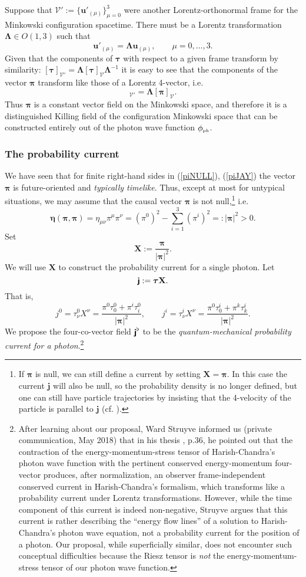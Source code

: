 \documentclass[12pt]{article}
\theoremstyle{definition}
\newcommand{\refeq}[1]{(\ref{#1})}
\newcommand{\tenseur}[1]{{\textbf{\textsf{#1}}}}
\newcommand{\bMj}{{\tenseur{j}}}
\newcommand{\bpi}{\boldsymbol{\pi}}
\numberwithin{equation}{section}
\newcommand{\bj}{\mathbf{j}}
\newcommand{\bu}{\mathbf{u}}
\newcommand{\bX}{\mathbf{X}}
\newcommand{\btau}{\boldsymbol{\tau}}
\newcommand{\beq}{\begin{equation}}
\newcommand{\eeq}{\end{equation}}
\newcommand{\cV}{\mathcal{V}}
\newcommand{\bLa}{\boldsymbol{\Lambda}}
\newcommand{\phiPH}{{\phi_{\mbox{\rm\tiny ph}}}}
\begin{document}
 Suppose that $\cV' := \{\bu'_{(\mu)}\}_{\mu=0}^3$ were another Lorentz-orthonormal frame for the Minkowski configuration spacetime. 
 There must be a Lorentz transformation $\bLa \in O(1,3)$ such that 
\beq
\bu'_{(\mu)} = \bLa \bu_{(\mu)},\qquad \mu = 0,\dots,3.
\eeq
Given that the components of $\btau$ with respect to a given frame transform by similarity: 
$[\btau]_{\cV'} = \bLa [\btau]_{\cV} \bLa^{-1}$ it is easy to see that the components of the vector $\bpi$ transform like those of a 
Lorentz 4-vector, i.e. 
\beq 
[\bpi]_{\cV'} = \bLa [\bpi]_{\cV}.
\eeq
Thus $\bpi$ is a constant vector field on the Minkowski space, and therefore it is a distinguished Killing field of the configuration 
Minkowski space that can be constructed entirely out of the photon wave function $\phiPH$.  
\subsubsection{The probability current}
 We have seen that for finite right-hand sides in \refeq{piNULL}, \refeq{piJAY} the vector $\bpi$ is 
future-oriented and \emph{typically timelike}.
 Thus, except at most for untypical situations, we may assume that the causal vector $\bpi$ is not null,\footnote{If 
   $\bpi$ is null, we can still define a current by setting $\bX = \bpi$. 
 In this case the current $\bj$ will also be null, so the probability density is no longer defined, but one can still have particle 
   trajectories by insisting that the 4-velocity of the particle is parallel to $\bj$ (cf. \cite{BerndlETal}).}
i.e. 
\beq
\boldsymbol{\eta} (\bpi,\bpi) = \eta_{\mu\nu}\pi^\mu \pi^\nu = 
 (\pi^0)^2 - \sum_{i=1}^3 (\pi^i)^2  =: |\bpi|^2 >0.
\eeq
 Set
\beq
\bX := \frac{\bpi}{|\bpi|^2}.
\eeq
 We will use $\bX$ to construct the probability current for a single photon. 
 Let
\beq \label{def:j}
\bMj := \btau \bX.
\eeq
 That is,
\beq
j^0 = \tau^0_\nu X^\nu = \frac{\pi^0 \tau^0_0 + \pi^i \tau^0_i}{|\bpi|^2},\qquad
j^i = \tau^i_\nu X^\nu = \frac{\pi^0 \tau^i_0 + \pi^k \tau^i_k}{|\bpi|^2}.
\eeq
 We propose the four-co-vector field $\bMj^\flat$ to be the \emph{quantum-mechanical probability current for a photon}.\footnote{After 
   learning about our proposal, Ward Struyve informed us (private communication, May 2018) that in his thesis \cite{StruyvePHD}, p.36, 
   he pointed out that the contraction of the energy-momentum-stress tensor of Harish-Chandra's photon wave function with the pertinent conserved
   energy-momentum four-vector produces, after normalization, an observer frame-independent conserved current in Harish-Chandra's formalism, 
   which transforms like a probability current under Lorentz transformations.
   However, while the time component of this current is indeed non-negative, Struyve argues that this current is rather describing the 
   ``energy flow lines'' of a solution to Harish-Chandra's photon wave equation, not a probability current for the position of a photon. 
    Our proposal, while superficially similar, does not encounter such conceptual difficulties because the Riesz tensor is \emph{not} the 
    energy-momentum-stress tensor of our photon wave function.\label{fn:Ward}}
\end{document}
